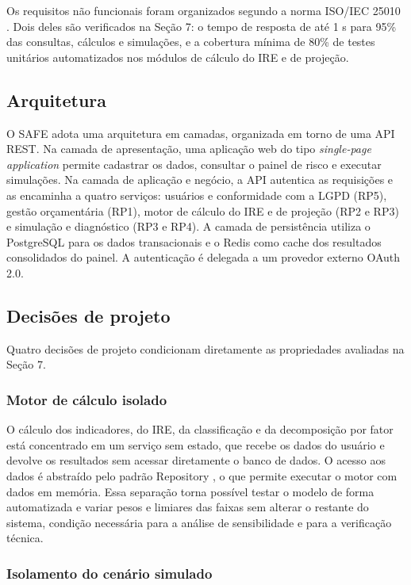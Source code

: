 \documentclass[portuguese]{sbc2025}%
\begin{document}
Os requisitos não funcionais foram organizados segundo a norma ISO/IEC 25010 \citep{iso25010}. Dois deles são verificados na Seção 7: o tempo de resposta de até 1 s para 95\% das consultas, cálculos e simulações, e a cobertura mínima de 80\% de testes unitários automatizados nos módulos de cálculo do IRE e de projeção.

\subsection{Arquitetura}

O SAFE adota uma arquitetura em camadas, organizada em torno de uma API REST. Na camada de apresentação, uma aplicação web do tipo \textit{single-page application} permite cadastrar os dados, consultar o painel de risco e executar simulações. Na camada de aplicação e negócio, a API autentica as requisições e as encaminha a quatro serviços: usuários e conformidade com a LGPD (RP5), gestão orçamentária (RP1), motor de cálculo do IRE e de projeção (RP2 e RP3) e simulação e diagnóstico (RP3 e RP4). A camada de persistência utiliza o PostgreSQL para os dados transacionais e o Redis como cache dos resultados consolidados do painel. A autenticação é delegada a um provedor externo OAuth 2.0.

\subsection{Decisões de projeto}

Quatro decisões de projeto condicionam diretamente as propriedades avaliadas na Seção 7.

\subsubsection{Motor de cálculo isolado}

O cálculo dos indicadores, do IRE, da classificação e da decomposição por fator está concentrado em um serviço sem estado, que recebe os dados do usuário e devolve os resultados sem acessar diretamente o banco de dados. O acesso aos dados é abstraído pelo padrão Repository \citep{fowler2002}, o que permite executar o motor com dados em memória. Essa separação torna possível testar o modelo de forma automatizada e variar pesos e limiares das faixas sem alterar o restante do sistema, condição necessária para a análise de sensibilidade e para a verificação técnica.

\subsubsection{Isolamento do cenário simulado}
\end{document}
